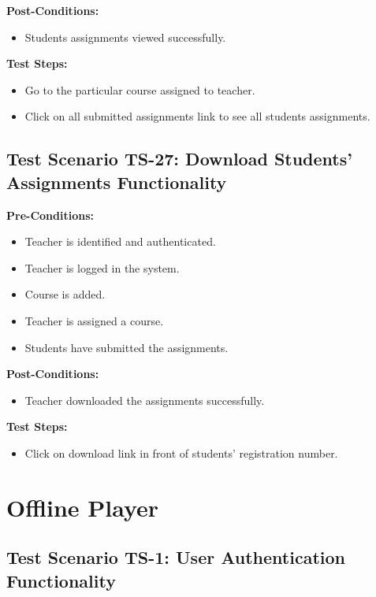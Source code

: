 \textbf{Post-Conditions: }
\begin{itemize}
\item Students assignments viewed successfully.

\end{itemize}
\textbf{Test Steps:}
\begin{itemize}

\item Go to the particular course assigned to teacher.
\item Click on all submitted assignments link to see all students assignments.

\end{itemize}


\subsection{Test Scenario TS-27: Download Students' Assignments Functionality}
\textbf{Pre-Conditions: }
\begin{itemize}

\item Teacher is identified and authenticated.
\item Teacher is logged in the system.
\item Course is added.
\item Teacher is assigned a course.
\item Students have submitted the assignments.

\end{itemize}

\textbf{Post-Conditions: }
\begin{itemize}
\item Teacher downloaded the assignments successfully.

\end{itemize}
\textbf{Test Steps:}
\begin{itemize}

\item Click on download link in front of students' registration number.

\end{itemize}

\section{Offline Player}
\subsection{Test Scenario TS-1: User Authentication Functionality}

